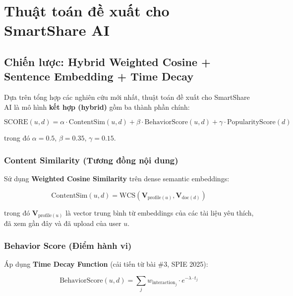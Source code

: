 \documentclass[12pt,a4paper]{article}
\begin{document}
\section{Thuật toán đề xuất cho SmartShare AI}

\subsection{Chiến lược: Hybrid Weighted Cosine + Sentence Embedding + Time Decay}

Dựa trên tổng hợp các nghiên cứu mới nhất, thuật toán đề xuất cho SmartShare AI là mô hình \textbf{kết hợp (hybrid)} gồm ba thành phần chính:

\begin{equation}
\text{SCORE}(u, d) = \alpha \cdot \text{ContentSim}(u, d) + \beta \cdot \text{BehaviorScore}(u, d) + \gamma \cdot \text{PopularityScore}(d)
\label{eq:hybrid}
\end{equation}

trong đó $\alpha = 0.5$, $\beta = 0.35$, $\gamma = 0.15$.

\subsubsection{Content Similarity (Tương đồng nội dung)}

Sử dụng \textbf{Weighted Cosine Similarity} trên dense semantic embeddings:

\begin{equation}
\text{ContentSim}(u, d) = \text{WCS}(\mathbf{V}_{\text{profile}(u)}, \mathbf{V}_{\text{doc}(d)})
\end{equation}

trong đó $\mathbf{V}_{\text{profile}(u)}$ là vector trung bình từ embeddings của các tài liệu yêu thích, đã xem gần đây và đã upload của user $u$.

\subsubsection{Behavior Score (Điểm hành vi)}

Áp dụng \textbf{Time Decay Function} (cải tiến từ bài \#3, SPIE 2025):

\begin{equation}
\text{BehaviorScore}(u, d) = \sum_{j} w_{\text{interaction}_j} \cdot e^{-\lambda \cdot t_j}
\end{equation}
\end{document}
